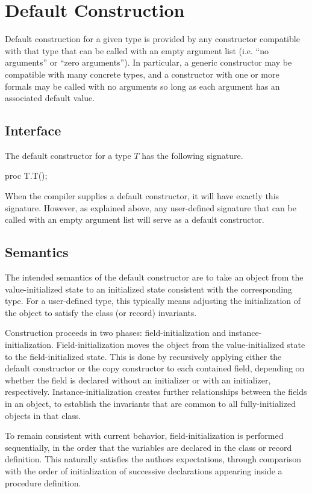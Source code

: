 \section{Default Construction}

Default construction for a given type is provided by any constructor compatible
with that type that can be called with an empty argument list (i.e. ``no
arguments'' or ``zero arguments'').  In particular, a generic constructor may be
compatible with many concrete types, and a constructor with one or more formals
may be called with no arguments so long as each argument has an associated
default value.

\subsection{Interface}

The default constructor for a type $T$ has the following signature.
\begin{chapel}
proc T.T();
\end{chapel}
When the compiler supplies a default constructor, it will have exactly this
signature.  However, as explained above, any user-defined signature that can be
called with an empty argument list will serve as a default constructor.

\subsection{Semantics}

The intended semantics of the default constructor are to take an object from the
value-initialized state to an initialized state consistent with the
corresponding type.  For a user-defined type, this typically means adjusting the
initialization of the object to satisfy the class (or record) invariants.

Construction proceeds in two phases: field-initialization and
instance-initialization.  Field-initialization moves the object from the
value-initialized state to the field-initialized state.  This is done by
recursively applying either the default constructor or the copy constructor to
each contained field, depending on whether the field is declared without an
initializer or with an initializer, respectively.  Instance-initialization
creates further relationships between the fields in an object, to establish the
invariants that are common to all fully-initialized objects in that class.

To remain consistent with current behavior, field-initialization is performed
sequentially, in the order that the variables are declared in the class or
record definition.  This naturally satisfies the authors expectations, through
comparison with the order of initialization of successive declarations appearing
inside a procedure definition.

